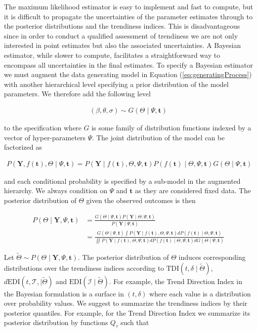 \documentclass[11pt,]{article}
\theoremstyle{nonumberplain}
\begin{document}
The maximum likelihood estimator is easy to implement and fast to
compute, but it is difficult to propagate the uncertainties of the
parameter estimates through to the posterior distributions and the
trendiness indices. This is disadvantageous since in order to conduct a
qualified assessment of trendiness we are not only interested in point
estimates but also the associated uncertainties. A Bayesian estimator,
while slower to compute, facilitates a straightforward way to encompass
all uncertainties in the final estimates. To specify a Bayesian
estimator we must augment the data generating model in Equation
(\ref{eq:generatingProcess}) with another hierarchical level specifying
a prior distribution of the model parameters. We therefore add the
following level

\begin{align*}
  (\beta, \theta, \sigma) \sim G(\Theta \mid \Psi, \mathbf{t})
\end{align*}

to the specification where \(G\) is some family of distribution
functions indexed by a vector of hyper-parameters \(\Psi\). The joint
distribution of the model can be factorized as

\begin{align*}
  P(\mathbf{Y}, f(\mathbf{t}), \Theta \mid \Psi, \mathbf{t}) = P(\mathbf{Y} \mid f(\mathbf{t}), \Theta, \Psi, \mathbf{t})P(f(\mathbf{t}) \mid \Theta, \Psi, \mathbf{t})G(\Theta \mid \Psi, \mathbf{t})
\end{align*}

and each conditional probability is specified by a sub-model in the
augmented hierarchy. We always condition on \(\Psi\) and \(\mathbf{t}\)
as they are considered fixed data. The posterior distribution of
\(\Theta\) given the observed outcomes is then

\begin{align*}
  P(\Theta \mid \mathbf{Y}, \Psi, \mathbf{t}) & = \frac{G(\Theta \mid \Psi, \mathbf{t})P(\mathbf{Y} \mid \Theta, \Psi, \mathbf{t})}{P(\mathbf{Y} \mid \Psi, \mathbf{t})}\\
   &= \frac{G(\Theta \mid \Psi, \mathbf{t}) \int P(\mathbf{Y} \mid f(\mathbf{t}), \Theta, \Psi, \mathbf{t})dP(f(\mathbf{t}) \mid \Theta, \Psi, \mathbf{t})}{\iint P(\mathbf{Y} \mid f(\mathbf{t}), \Theta, \Psi, \mathbf{t})dP(f(\mathbf{t}) \mid \Theta, \Psi, \mathbf{t})dG(\Theta \mid \Psi, \mathbf{t})}
\end{align*}

Let
\(\widetilde{\Theta} \sim P(\Theta \mid \mathbf{Y}, \Psi, \mathbf{t})\).
The posterior distribution of \(\Theta\) induces corresponding
distributions over the trendiness indices according to
\(\mathrm{TDI}(t, \delta \mid \widetilde{\Theta})\),
\(d\mathrm{EDI}(t, \mathcal{T}, \mid \widetilde{\Theta})\) and
\(\mathrm{EDI}(\mathcal{I} \mid \widetilde{\Theta})\). For example, the
Trend Direction Index in the Bayesian formulation is a surface in
\((t, \delta)\) where each value is a distribution over probability
values. We suggest to summarize the trendiness indices by their
posterior quantiles. For example, for the Trend Direction Index we
summarize its posterior distribution by functions \(Q_\tau\) such that
\end{document}

